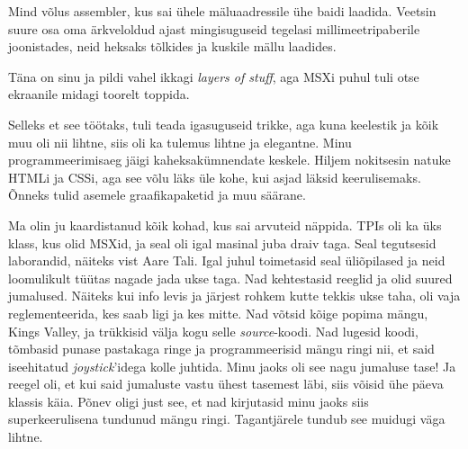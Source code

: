 Mind võlus assembler, kus sai ühele mäluaadressile ühe 
baidi laadida. Veetsin suure osa oma ärkveloldud 
ajast mingisuguseid tegelasi millimeetripaberile joonistades, neid heksaks 
tõlkides ja kuskile mällu laadides. 


Täna on sinu ja pildi vahel ikkagi \emph{layers of stuff}, aga MSXi puhul tuli 
otse ekraanile midagi
toorelt toppida. 


Selleks et see töötaks, tuli teada igasuguseid trikke, aga kuna keelestik ja 
kõik muu oli nii lihtne, siis oli ka tulemus lihtne ja elegantne. Minu
programmeerimisaeg jäigi kaheksakümnendate keskele. Hiljem nokitsesin
natuke HTMLi ja CSSi, aga see võlu läks üle kohe, kui asjad läksid 
keerulisemaks. Õnneks tulid asemele 
graafikapaketid ja muu säärane. 


Ma olin ju kaardistanud kõik kohad, kus sai arvuteid 
näppida. TPIs oli ka üks klass, kus olid 
MSXid, ja seal oli igal masinal juba draiv taga. 
Seal tegutsesid laborandid, näiteks vist Aare Tali. Igal juhul toimetasid seal 
üliõpilased ja neid loomulikult tüütas nagade jada ukse taga. Nad kehtestasid 
reeglid ja olid suured jumalused. Näiteks kui info levis ja järjest 
rohkem kutte tekkis ukse taha, oli vaja reglementeerida, kes saab 
ligi ja kes mitte. 
Nad võtsid kõige popima mängu, Kings Valley, ja trükkisid 
välja kogu selle 
\emph{source}-koodi. Nad lugesid koodi, tõmbasid punase pastakaga ringe ja 
programmeerisid mängu ringi nii, 
et said iseehitatud \emph{joystick}'idega kolle juhtida. Minu jaoks oli see 
nagu jumaluse tase! 
Ja reegel oli, et kui said 
jumaluste vastu ühest tasemest läbi, siis võisid ühe päeva klassis käia. Põnev 
oligi just see, et nad kirjutasid
minu jaoks siis superkeerulisena tundunud mängu ringi. Tagantjärele tundub see 
muidugi väga lihtne.


